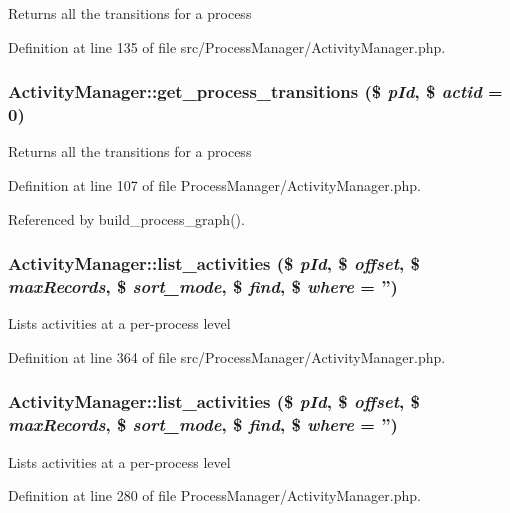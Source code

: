 Returns all the transitions for a process 

Definition at line 135 of file src/Process\-Manager/Activity\-Manager.php.
\subsubsection{\setlength{\rightskip}{0pt plus 5cm}Activity\-Manager::get\_\-process\_\-transitions (\$ {\em p\-Id}, \$ {\em actid} = 0)}\label{classActivityManager_a7}


Returns all the transitions for a process 

Definition at line 107 of file Process\-Manager/Activity\-Manager.php.

Referenced by build\_\-process\_\-graph().
\subsubsection{\setlength{\rightskip}{0pt plus 5cm}Activity\-Manager::list\_\-activities (\$ {\em p\-Id}, \$ {\em offset}, \$ {\em max\-Records}, \$ {\em sort\_\-mode}, \$ {\em find}, \$ {\em where} = '')}\label{classActivityManager_a32}


Lists activities at a per-process level 

Definition at line 364 of file src/Process\-Manager/Activity\-Manager.php.
\subsubsection{\setlength{\rightskip}{0pt plus 5cm}Activity\-Manager::list\_\-activities (\$ {\em p\-Id}, \$ {\em offset}, \$ {\em max\-Records}, \$ {\em sort\_\-mode}, \$ {\em find}, \$ {\em where} = '')}\label{classActivityManager_a13}


Lists activities at a per-process level 

Definition at line 280 of file Process\-Manager/Activity\-Manager.php.
